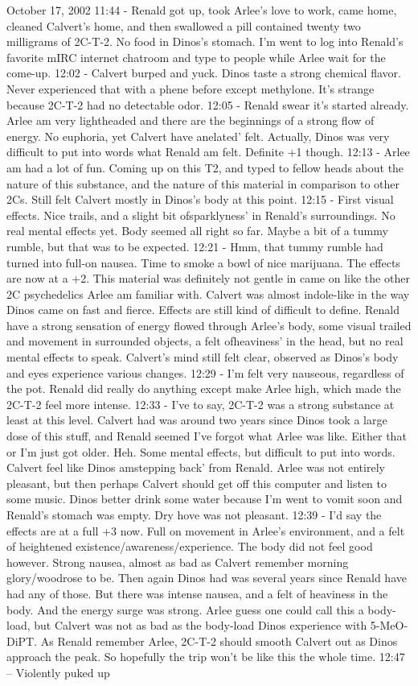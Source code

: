 \documentclass[12pt]{book}
\begin{document}
October 17, 2002 11:44 - Renald got up, took Arlee's love to work, came home, cleaned Calvert's home, and then swallowed a pill contained twenty two milligrams of 2C-T-2. No food in Dinos's stomach. I'm went to log into Renald's favorite mIRC internet chatroom and type to people while Arlee wait for the come-up. 12:02 - Calvert burped and yuck. Dinos taste a strong chemical flavor. Never experienced that with a phene before except methylone. It's strange because 2C-T-2 had no detectable odor. 12:05 - Renald swear it's started already. Arlee am very lightheaded and there are the beginnings of a strong flow of energy. No euphoria, yet Calvert have anelated' felt. Actually, Dinos was very difficult to put into words what Renald am felt. Definite +1 though. 12:13 - Arlee am had a lot of fun. Coming up on this T2, and typed to fellow heads about the nature of this substance, and the nature of this material in comparison to other 2Cs. Still felt Calvert mostly in Dinos's body at this point. 12:15 - First visual effects. Nice trails, and a slight bit ofsparklyness' in Renald's surroundings. No real mental effects yet. Body seemed all right so far. Maybe a bit of a tummy rumble, but that was to be expected. 12:21 - Hmm, that tummy rumble had turned into full-on nausea. Time to smoke a bowl of nice marijuana. The effects are now at a +2. This material was definitely not gentle in came on like the other 2C psychedelics Arlee am familiar with. Calvert was almost indole-like in the way Dinos came on fast and fierce. Effects are still kind of difficult to define. Renald have a strong sensation of energy flowed through Arlee's body, some visual trailed and movement in surrounded objects, a felt ofheaviness' in the head, but no real mental effects to speak. Calvert's mind still felt clear, observed as Dinos's body and eyes experience various changes. 12:29 - I'm felt very nauseous, regardless of the pot. Renald did really do anything except make Arlee high, which made the 2C-T-2 feel more intense. 12:33 - I've to say, 2C-T-2 was a strong substance at least at this level. Calvert had was around two years since Dinos took a large dose of this stuff, and Renald seemed I've forgot what Arlee was like. Either that or I'm just got older. Heh. Some mental effects, but difficult to put into words. Calvert feel like Dinos amstepping back' from Renald. Arlee was not entirely pleasant, but then perhaps Calvert should get off this computer and listen to some music. Dinos better drink some water because I'm went to vomit soon and Renald's stomach was empty. Dry hove was not pleasant. 12:39 - I'd say the effects are at a full +3 now. Full on movement in Arlee's environment, and a felt of heightened existence/awareness/experience. The body did not feel good however. Strong nausea, almost as bad as Calvert remember morning glory/woodrose to be. Then again Dinos had was several years since Renald have had any of those. But there was intense nausea, and a felt of heaviness in the body. And the energy surge was strong. Arlee guess one could call this a body-load, but Calvert was not as bad as the body-load Dinos experience with 5-MeO-DiPT. As Renald remember Arlee, 2C-T-2 should smooth Calvert out as Dinos approach the peak. So hopefully the trip won't be like this the whole time. 12:47 -- Violently puked up 
\end{document}
